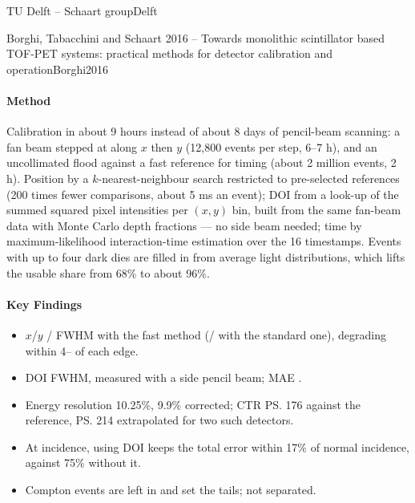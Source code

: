 \begin{programnote}{TU Delft -- Schaart group}{Delft}
\begin{papernote}{Borghi, Tabacchini and Schaart 2016 -- Towards monolithic scintillator based TOF-PET systems: practical methods for detector calibration and operation}{Borghi2016}
\paragraph{Method}
Calibration in about 9 hours instead of about 8 days of pencil-beam scanning:
a  fan beam stepped at  along $x$ then $y$ (12{,}800 events
per step, 6--7 h), and an uncollimated flood against a fast reference for
timing (about 2 million events, 2 h). Position by a $k$-nearest-neighbour
search restricted to pre-selected references (200 times fewer comparisons,
about 5 ms an event); DOI from a look-up of the summed squared pixel intensities
per $(x,y)$ bin, built from the same fan-beam data with Monte Carlo depth
fractions --- no side beam needed; time by maximum-likelihood interaction-time
estimation over the 16 timestamps. Events with up to four dark dies are filled
in from average light distributions, which lifts the usable share from 68\%
to about 96\%.

\paragraph{Key Findings}
\begin{itemize}
	\item $x$/$y$ / FWHM with the fast method (/
		with the standard one), degrading within 4-- of each edge.
	\item DOI  FWHM, measured with a side pencil beam; MAE .
	\item Energy resolution 10.25\%, 9.9\% corrected; CTR \ps{176} against the
		reference, \ps{214} extrapolated for two such detectors.
	\item At  incidence, using DOI keeps the total error within 17\% of
		normal incidence, against 75\% without it.
	\item Compton events are left in and set the tails; not separated.
\end{itemize}

\end{papernote}
 
\end{programnote}
 
 

